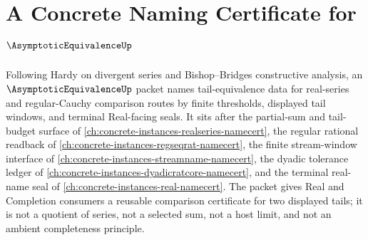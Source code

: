 \chapter{A Concrete Naming Certificate for $\AsymptoticEquivalenceUp$}
\label{ch:concrete-instances-asymptotic-equivalence-namecert}

Following Hardy on divergent series and Bishop--Bridges constructive analysis, an $\AsymptoticEquivalenceUp$ packet names tail-equivalence data for real-series and regular-Cauchy comparison routes by finite thresholds, displayed tail windows, and terminal Real-facing seals. It sits after the partial-sum and tail-budget surface of \autoref{ch:concrete-instances-realseries-namecert}, the regular rational readback of \autoref{ch:concrete-instances-regseqrat-namecert}, the finite stream-window interface of \autoref{ch:concrete-instances-streamname-namecert}, the dyadic tolerance ledger of \autoref{ch:concrete-instances-dyadicratcore-namecert}, and the terminal real-name seal of \autoref{ch:concrete-instances-real-namecert}. The packet gives Real and Completion consumers a reusable comparison certificate for two displayed tails; it is not a quotient of series, not a selected sum, not a host limit, and not an ambient completeness principle.

